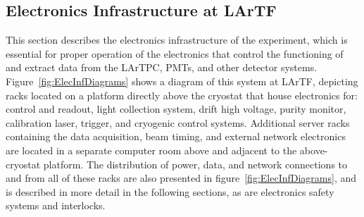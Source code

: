 \subsection{Electronics Infrastructure at LArTF}
\label{sec:lartf}


This section describes the electronics infrastructure of the experiment, which is essential for proper operation of the electronics that control the functioning of and extract data from the LArTPC, PMTs, and other detector systems.  Figure~\ref{fig:ElecInfDiagrams} shows a diagram of this system at LArTF, depicting racks located on a platform directly above the cryostat that house electronics for: \lartpc control and readout, light collection system, drift high voltage, purity monitor, calibration laser, trigger, and cryogenic control systems.  Additional server racks containing the data acquisition, beam timing, and external network electronics are located in a separate computer room above and adjacent to the above-cryostat platform.  The distribution of power, data, and network connections to and from all of these racks are also presented in figure~\ref{fig:ElecInfDiagrams}, and is described in more detail in the following sections, as are electronics safety systems and interlocks.

